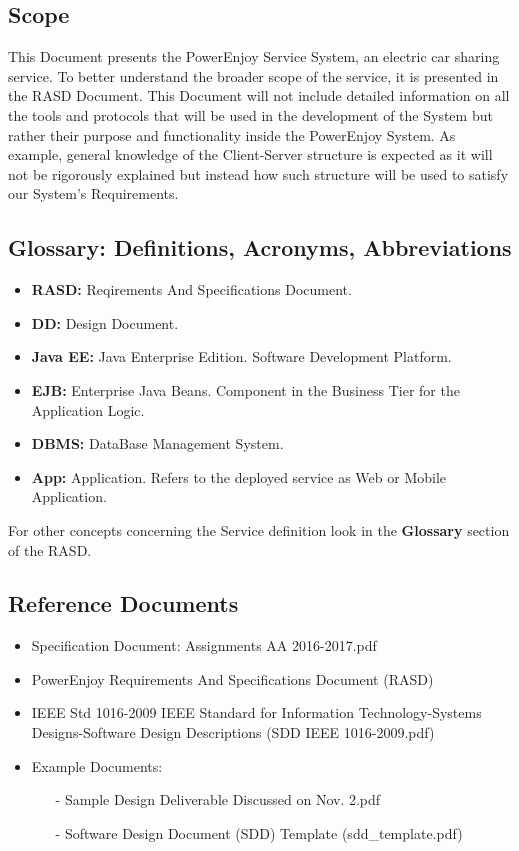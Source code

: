 \documentclass[a4paper]{article}
\begin{document}
\subsection{Scope}
This Document presents the PowerEnjoy Service System, an electric car sharing service. To better understand the broader scope of the service, it is presented in the RASD Document. This Document will not include detailed information on all the tools and protocols that will be used in the development of the System but rather their purpose and functionality inside the PowerEnjoy System. As example, general knowledge of the Client-Server structure is expected as it will not be rigorously explained but instead how such structure will be used to satisfy our System's Requirements. 

\subsection{Glossary: Definitions, Acronyms, Abbreviations}
\begin{itemize}
\item \textbf{RASD:} Reqirements And Specifications Document.
\item \textbf{DD:} Design Document.
\item \textbf{Java EE:} Java Enterprise Edition. Software Development Platform.
\item \textbf{EJB:} Enterprise Java Beans. Component in the Business Tier for the Application Logic.
\item \textbf{DBMS:} DataBase Management System.
\item \textbf{App:} Application. Refers to the deployed service as Web or Mobile Application.
\end{itemize}
For other concepts concerning the Service definition look in the \textbf{Glossary} section of the RASD.

\subsection{Reference Documents}
\begin{itemize}
\item Specification Document: Assignments AA 2016-2017.pdf
\item PowerEnjoy Requirements And Specifications Document (RASD)
\item IEEE Std 1016-2009 IEEE Standard for Information Technology-Systems Designs-Software Design Descriptions (SDD IEEE 1016-2009.pdf)
\item Example Documents:
\begin{itemize}
\item[-] Sample Design Deliverable Discussed on Nov. 2.pdf
\item[-] Software Design Document (SDD) Template (sdd\_template.pdf)
\end{itemize}
\end{itemize}
\end{document}
